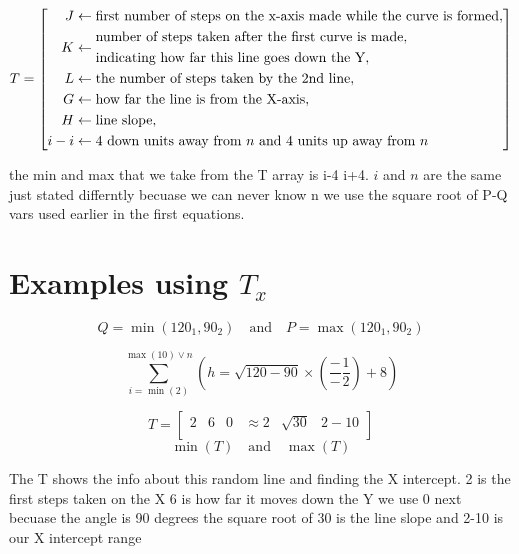 \documentclass{article}
\begin{document}
\[
T = \left[ \begin{array}{@{}l@{}}
    \begin{aligned}
        J &\leftarrow \text{first number of steps on the x-axis made while the curve is formed}, \\
        K &\leftarrow \begin{aligned}&\text{number of steps taken after the first curve is made,} \\ &\text{indicating how far this line goes down the Y},\end{aligned} \\
        L &\leftarrow \text{the number of steps taken by the 2nd line}, \\
        G &\leftarrow \text{how far the line is from the X-axis}, \\
        H &\leftarrow \text{line slope}, \\
        i-i &\leftarrow 4 \text{ down units away from } n \text{ and 4 units up away from } n
    \end{aligned}
\end{array} \right]
\]

the min and max that we take from the T array is i-4 i+4. \(i\) and \(n\) are the same just stated differntly becuase we can never know n we use the square root of P-Q vars used earlier in the first equations.

 \section{Examples using \(T_x\)}

\[
Q = \min(120_1, 90_2) \quad \text{and} \quad P = \max(120_1, 90_2)
\]

\[
\sum_{i=\min(2)}^{\max(10) \vee n} \left( h = \sqrt{120 - 90} \times \left( \frac{-}{-} \frac{1}{2} \right) + 8 \right)
\]

\[
T = \begin{bmatrix}
    2 & 6 & 0 & \approx 2 & \sqrt{30} & 2-10 \\
\end{bmatrix}
\]
\[
\min(T) \quad \text{and} \quad \max(T)
\]

The T shows the info about this random line and finding the X intercept. 2 is the first steps taken on the X 6 is how far it moves down the Y we use 0 next becuase the angle is 90 degrees the square root of 30 is the line slope and 2-10 is our X intercept range
\end{document}
